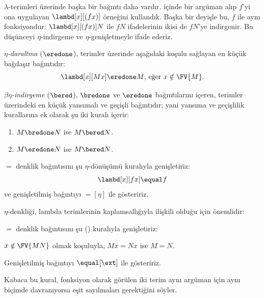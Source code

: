 \documentclass[../../../include/open-logic-section]{subfiles}
\begin{document}

$\lambda$-terimleri üzerinde başka bir bağıntı daha vardır. 
içinde bir argüman alıp $f$'yi ona uygulayan $\lambd[x][(fx)]$ örneğini
kullandık. Başka bir deyişle bu, $f$ ile aynı fonksiyondur:
$\lambd[x][(fx)]N$ ile $fN$ ifadelerinin ikisi de $fN$'ye indirgenir. Bu
düşünceyi $\eta$-indirgeme ve $\eta$-genişletmeyle ifade ederiz.

\begin{defn}
  \emph{$\eta$-daraltma} ($\eredone$), terimler üzerinde aşağıdaki koşulu
  sağlayan en küçük bağdaşır bağıntıdır:
  \[
    \lambd[x][M x] \eredone M \text{, eğer } x \notin \FV{M}.
  \]
\end{defn}

\begin{defn} 
  \emph{$\beta\eta$-indirgeme} ($\bered$), $\bredone$ ve $\eredone$
  bağıntılarını içeren, terimler üzerindeki en küçük yansımalı ve geçişli
  bağıntıdır; yani yansıma ve geçişlilik kurallarına ek olarak şu iki kuralı
  içerir:
  \begin{enumerate}
  \item $M \bredone N$ ise $M \bered N$. 
  \item $M \eredone N$ ise $M \bered N$. 
  \end{enumerate}

\end{defn}

\begin{defn}
  $\equal$ denklik bağıntısını şu $\eta$-dönüşümü kuralıyla genişletiriz:
  \[
  \lambd[x][f x] \equal f
  \]
  ve genişletilmiş bağıntıyı $\equal[\eta]$ ile gösteririz.
\end{defn}

$\eta$-denkliği, lambda terimlerinin kaplamsallığıyla ilişkili olduğu için
önemlidir:

\begin{defn}[Kaplamsallık]
  $\equal$ denklik bağıntısını şu (\ext) kuralıyla genişletiriz:
  \begin{center}
  $x \notin \FV{MN}$ olmak koşuluyla, $Mx \equal Nx$ ise $M \equal N$.
  \end{center}
  Genişletilmiş bağıntıyı $\equal[\ext]$ ile gösteririz.
\end{defn}

Kabaca bu kural, fonksiyon olarak görülen iki terim aynı argüman için aynı
biçimde davranıyorsa eşit sayılmaları gerektiğini söyler.
\end{document}
